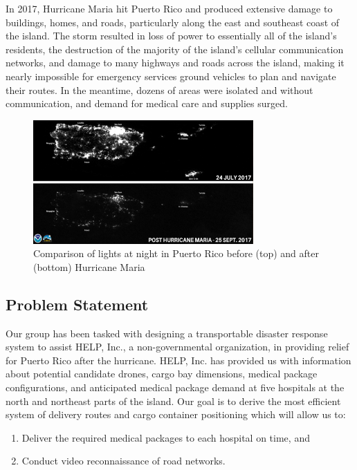 In 2017, Hurricane Maria hit Puerto Rico and produced extensive damage to buildings, homes, and roads, particularly along the east and southeast coast of the island. The storm resulted in loss of power to essentially all of the island's residents, the destruction of the majority of the island’s cellular communication networks, and damage to many highways and roads across the island, making it nearly impossible for emergency services ground vehicles to plan and navigate their routes. In the meantime, dozens of areas were isolated and without communication, and demand for medical care and supplies surged.

\begin{figure}[h]
    \centering
    \includegraphics[width=0.75\textwidth]{after_hurricane.jpg}
    \caption{Comparison of lights at night in Puerto Rico before (top) and after (bottom) Hurricane Maria \cite{after_hurricane}}
    \label{fig:hurricane}
\end{figure}

\subsection{Problem Statement}
Our group has been tasked with designing a transportable disaster response system to assist HELP, Inc., a non-governmental organization, in providing relief for Puerto Rico after the hurricane. HELP, Inc. has provided us with information about potential candidate drones, cargo bay dimensions, medical package configurations, and anticipated medical package demand at five hospitals at the north and northeast parts of the island. Our goal is to derive the most efficient system of delivery routes and cargo container positioning which will allow us to:
\begin{enumerate}
    \item Deliver the required medical packages to each hospital on time, and 
    \item Conduct video reconnaissance of road networks.
\end{enumerate}

